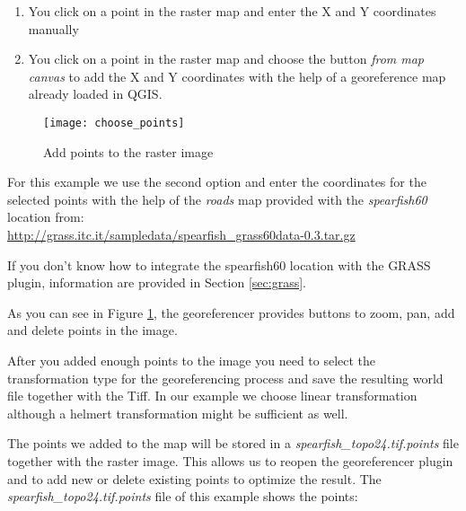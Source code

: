 \begin{enumerate}
\item You click on a point in the raster map and enter the X and Y 
coordinates manually
\item You click on a point in the raster map and choose the button
\textsl{from map canvas} to add the X and Y coordinates with the help 
of a georeference map already loaded in QGIS.
\end{enumerate}

\begin{figure}[ht]
\begin{center}
  \caption{Add points to the raster image}\label{fig:choose_points}\smallskip
  \texttt{[image: choose\_points]}
\end{center}
\end{figure}

For this example we use the second option and enter the coordinates for the
selected points with the help of the \textsl{roads} map provided with the 
\textsl{spearfish60} location from: \\
\url{http://grass.itc.it/sampledata/spearfish\_grass60data-0.3.tar.gz}

If you don't know how to integrate the spearfish60 location with the GRASS plugin, 
information are provided in Section \ref{sec:grass}. 

As you can see in Figure \ref{fig:choose_points}, the georeferencer provides buttons 
to zoom, pan, add and delete points in the image.   

After you added enough points to the image you need to select the transformation 
type for the georeferencing process and save the resulting world file together with 
the Tiff. In our example we choose linear transformation although a helmert 
transformation might be sufficient as well. 

\begin{Tip}\caption{\textsc{Choosing the transformation type}}
\end{Tip} 

The points we added to the map will be stored in a \textsl{spearfish\_topo24.tif.points} file together 
with the raster image. This allows us to reopen the georeferencer plugin and to add new or delete 
existing points to optimize the result. The \textsl{spearfish\_topo24.tif.points} file of this 
example shows the points:

